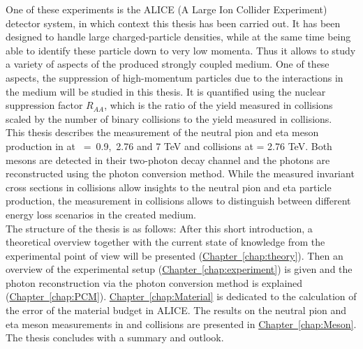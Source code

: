 One of these experiments is the ALICE (A Large Ion Collider Experiment) detector system, in which context this thesis has been carried out. It has been designed to handle large charged-particle densities, while at the same time being able to identify these particle down to very low momenta. Thus it allows to study a variety of aspects of the produced strongly coupled medium. One of these aspects, the suppression of high-momentum particles due to the interactions in the medium will be studied in this thesis. It is quantified using the nuclear suppression factor $R_{AA}$, which is the ratio of the yield measured in \Pb collisions scaled by the number of binary collisions to the yield measured in \pp collisions. \\
This thesis describes the measurement of the neutral pion and eta meson production in \pp at \s~=~0.9,~2.76 and 7 TeV and \Pb collisions at \sNN = 2.76 TeV. Both mesons are detected in their two-photon decay channel and the photons are reconstructed using the photon conversion method. While the measured invariant cross sections in \pp collisions allow insights to the neutral pion and eta particle production, the measurement in \Pb collisions allows to distinguish between different energy loss scenarios in the created medium.\\

The structure of the thesis is as follows: After this short introduction, a theoretical overview together with the current state of knowledge from the experimental point of view will be presented (\hyperref[chap:theory]{Chapter~\ref*{chap:theory}}). Then an overview of the experimental setup (\hyperref[chap:experiment]{Chapter~\ref*{chap:experiment}}) is given and the photon reconstruction via the photon conversion method is explained (\hyperref[chap:PCM]{Chapter~\ref*{chap:PCM}}). \hyperref[chap:Material]{Chapter~\ref*{chap:Material}} is dedicated to the calculation of the error of the material budget in ALICE. The results on the neutral pion and eta meson measurements in \pp and \Pb collisions are presented in \hyperref[chap:Meson]{Chapter~\ref*{chap:Meson}}. The thesis concludes with a summary and outlook.
